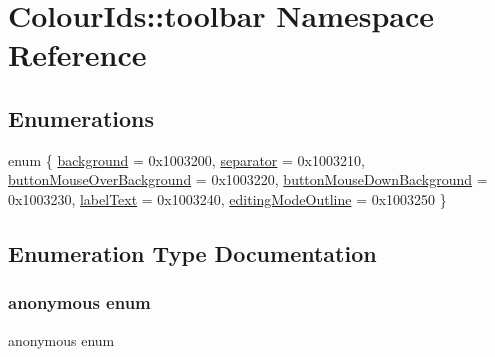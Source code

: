 \hypertarget{namespaceColourIds_1_1toolbar}{}\section{Colour\+Ids\+:\+:toolbar Namespace Reference}
\label{namespaceColourIds_1_1toolbar}
\subsection*{Enumerations}
\begin{DoxyCompactItemize}
\item 
enum \{ \newline
\mbox{\hyperlink{namespaceColourIds_1_1toolbar_aef74e5a274bddae9eaa3ce3476491969a32d34413c8dc5d7f952152cac59d307c}{background}} = 0x1003200, 
\mbox{\hyperlink{namespaceColourIds_1_1toolbar_aef74e5a274bddae9eaa3ce3476491969ad1a281a87c7d9ed8f7b54c62fc05877a}{separator}} = 0x1003210, 
\mbox{\hyperlink{namespaceColourIds_1_1toolbar_aef74e5a274bddae9eaa3ce3476491969a156347db1ee22abf1fad60058d89aecb}{button\+Mouse\+Over\+Background}} = 0x1003220, 
\mbox{\hyperlink{namespaceColourIds_1_1toolbar_aef74e5a274bddae9eaa3ce3476491969a24eae8b4e16e65d05c1f630e497a9088}{button\+Mouse\+Down\+Background}} = 0x1003230, 
\newline
\mbox{\hyperlink{namespaceColourIds_1_1toolbar_aef74e5a274bddae9eaa3ce3476491969ac1f6cf5c3edc8e6d4b6e3b2d6d3cd783}{label\+Text}} = 0x1003240, 
\mbox{\hyperlink{namespaceColourIds_1_1toolbar_aef74e5a274bddae9eaa3ce3476491969a34062d3efc728b2d89e8d1506c26e579}{editing\+Mode\+Outline}} = 0x1003250
 \}
\end{DoxyCompactItemize}


\subsection{Enumeration Type Documentation}
\mbox{\label{namespaceColourIds_1_1toolbar_aef74e5a274bddae9eaa3ce3476491969}} 
\subsubsection{\texorpdfstring{anonymous enum}{anonymous enum}}
{\footnotesize\ttfamily anonymous enum}

